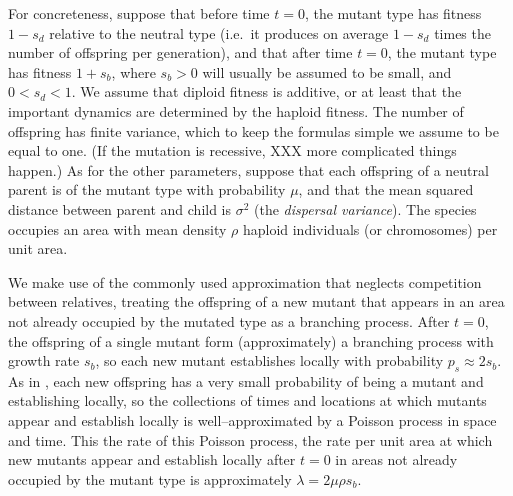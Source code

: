 \documentclass{article}
\begin{document}
For concreteness, suppose that before time $t=0$,
the mutant type has fitness $1-s_d$ relative to the neutral type
(i.e.\ it produces on average $1-s_d$ times the number of offspring per generation),
and that after time $t=0$,
the mutant type has fitness $1+s_b$,
where $s_b>0$ will usually be assumed to be small, and $0<s_d<1$.
We assume that diploid fitness is additive, or at least that the important dynamics are determined by the haploid fitness.
The number of offspring has finite variance, which to keep the formulas simple we assume to be equal to one.
(If the mutation is recessive, XXX more complicated things happen.)
As for the other parameters,
suppose that each offspring of a neutral parent is of the mutant type with probability $\mu$,
and that the mean squared distance between parent and child is $\sigma^2$ (the {\em dispersal variance}).
The species occupies an area with mean density
$\rho$ haploid individuals (or chromosomes) per unit area.


We make use of the commonly used approximation that neglects competition between relatives,
treating the offspring of a new mutant that appears in an area not already occupied by the mutated type
as a branching process.
After $t=0$, the offspring of a single mutant form (approximately) a branching process with growth rate $s_b$,
so each new mutant establishes locally with probability $p_s \approx 2s_b$.
As in \cite{ralphcoop2010}, each new offspring has a very small probability of being a mutant and establishing locally,
so the collections of times and locations at which mutants appear and establish locally 
is well--approximated by a Poisson process in space and time.
This the rate of this Poisson process, 
the rate per unit area at which new mutants appear and establish locally after $t=0$ in areas not already occupied by the mutant type
is approximately $\lambda = 2 \mu \rho s_b$.
\end{document}
